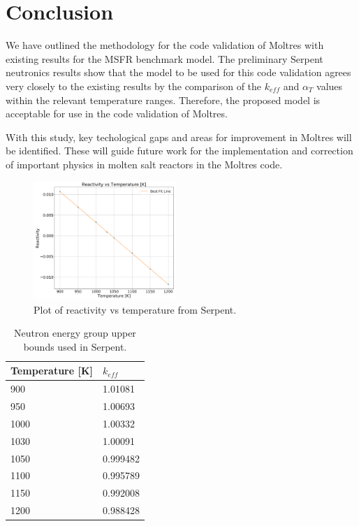 \documentclass{anstrans}
\begin{document}
\section{Conclusion}

We have outlined the methodology for the code validation of Moltres with existing results for the MSFR benchmark model. The preliminary Serpent neutronics results show that the model to be used for this code validation agrees very closely to the existing results by the comparison of the $k_{eff}$ and $\alpha_T$ values within the relevant temperature ranges. Therefore, the proposed model is acceptable for use in the code validation of Moltres.

With this study, key techological gaps and areas for improvement in Moltres will be identified. These will guide future work for the implementation and correction of important physics in molten salt reactors in the Moltres code.
%
\begin{figure}[h!] 
	\centering
	\includegraphics[width=0.48\textwidth]{./figures/reactivityplot}
	\captionsetup{justification=centering}
	\caption{Plot of reactivity vs temperature from Serpent.}
	\label{fig:reactivity}
\end{figure} 
%
\begin{table}[h!]
\centering
\begin{tabular}{ll}
\hline
{Temperature [K]} & {$k_{eff}$}\\
\hline
900 & 1.01081\\
950 & 1.00693\\
1000 & 1.00332\\
1030 & 1.00091\\
1050 & 0.999482\\
1100 & 0.995789\\
1150 & 0.992008\\
1200 & 0.988428\\
\hline
\end{tabular}
\captionsetup{justification=centering}
\caption{Neutron energy group upper bounds used in Serpent.}
\label{table:keff}
\end{table}
\end{document}
